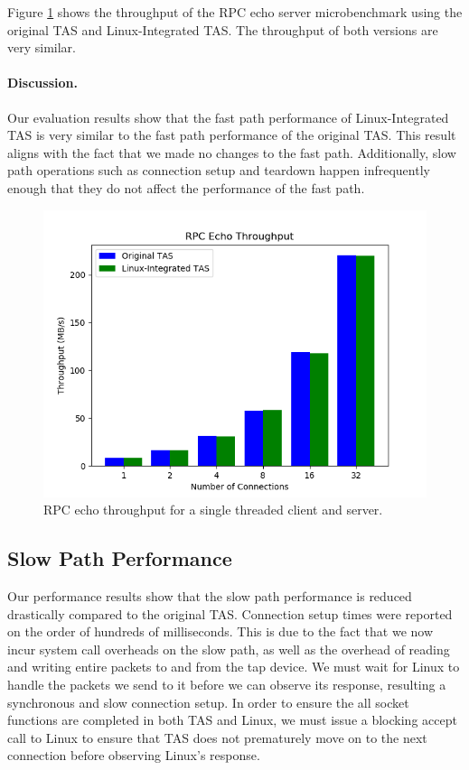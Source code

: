 Figure \ref{fig:fastpath-throughput} shows the throughput of the RPC echo server
microbenchmark using the original TAS and Linux-Integrated TAS. The throughput 
of both versions are very similar.

\paragraph{Discussion.} Our evaluation results show that the fast path 
performance of Linux-Integrated TAS is very similar to the fast path performance 
of the original TAS. This result aligns with the fact that we made no changes to
the fast path. Additionally, slow path operations such as connection setup and
teardown happen infrequently enough that they do not affect the performance of 
the fast path.

\begin{figure}
  \centering
  \includegraphics[width=\columnwidth]{figures/rpc_echo_throughput.png}
  \caption{RPC echo throughput for a single threaded client and server.}
  \label{fig:fastpath-throughput}
  \vspace{-2pt}
\end{figure}

\subsection{Slow Path Performance}

Our performance results show that the slow path performance is reduced 
drastically compared to the original TAS. Connection setup times were reported 
on the order of hundreds of milliseconds. This is due to the fact that we now 
incur system call overheads on the slow path, as well as the overhead of reading
and writing entire packets to and from the tap device. We must wait for Linux to
handle the packets we send to it before we can observe its response, resulting 
a synchronous and slow connection setup. In order to ensure the all socket 
functions are completed in both TAS and Linux,  we must issue a blocking 
accept call to Linux to ensure that TAS does not prematurely move on to the next 
connection before observing Linux's response.

